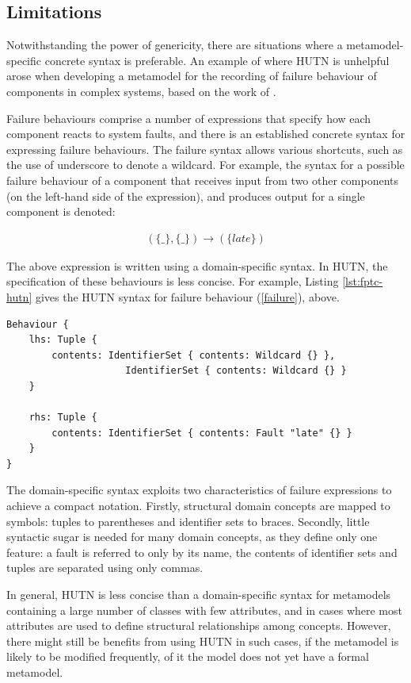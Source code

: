 \subsection{Limitations}
Notwithstanding the power of genericity, there are situations where a metamodel-specific concrete syntax is preferable. An example of where HUTN is unhelpful arose when developing a metamodel for the recording of failure behaviour of components in complex systems, based on the work of \cite{wallace05modular}.

Failure behaviours comprise a number of expressions that specify how each component reacts to system faults, and there is an established concrete syntax for expressing failure behaviours. The failure syntax allows various shortcuts, such as the use of underscore to denote a wildcard. For example, the syntax for a possible failure behaviour of a component that receives input from two other components (on the left-hand side of the expression), and produces output for a single component is denoted:

\begin{eqnarray}\label{failure}
(\{\_\}, \{\_\}) \rightarrow (\{late\})
\end{eqnarray}

The above expression is written using a domain-specific syntax. In HUTN, the specification of these behaviours is less concise. For example, Listing \ref{lst:fptc-hutn} gives the HUTN syntax for failure behaviour (\ref{failure}), above.

\begin{lstlisting}[caption=Failure behaviour specified in HUTN., label=lst:fptc-hutn, language=FPTC]
Behaviour {
    lhs: Tuple {
        contents: IdentifierSet { contents: Wildcard {} },
                     IdentifierSet { contents: Wildcard {} }
    }

    rhs: Tuple {
        contents: IdentifierSet { contents: Fault "late" {} }
    }
}
\end{lstlisting}

The domain-specific syntax exploits two characteristics of failure expressions to achieve a compact notation. Firstly, structural domain concepts are mapped to symbols: tuples to parentheses and identifier sets to braces. Secondly, little syntactic sugar is needed for many domain concepts, as they define only one feature: a fault is referred to only by its name, the contents of identifier sets and tuples are separated using only commas.

In general, HUTN is less concise than a domain-specific syntax for metamodels containing a large number of classes with few attributes, and in cases where most attributes are used to define structural relationships among concepts. However, there might still be benefits from using HUTN in such cases, if the metamodel is likely to be modified frequently, of it the model does not yet have a formal metamodel.

